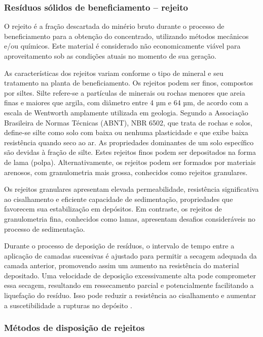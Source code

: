 \subsubsection{Resíduos sólidos de beneficiamento -- rejeito}
\label{subsubsec:rejeitos}

O rejeito é a fração descartada do minério bruto durante o processo de
beneficiamento para a obtenção do concentrado, utilizando métodos
mecânicos e/ou químicos. Este material é considerado não economicamente
viável para aproveitamento sob as condições atuais no momento de sua
geração.

As características dos rejeitos variam conforme o tipo de mineral e seu
tratamento na planta de beneficiamento. Os rejeitos podem ser finos,
compostos por siltes. Silte refere-se a partículas de minerais ou rochas
menores que areia finas e maiores que argila, com diâmetro entre 4 µm e
64 µm, de acordo com a escala de Wentworth amplamente utilizada em
geologia. Segundo a Associação Brasileira de Normas Técnicas (ABNT), NBR
6502, que trata de rochas e solos, define-se silte como solo com baixa
ou nenhuma plasticidade e que exibe baixa resistência quando seco ao ar.
As propriedades dominantes de um solo específico são devidas à fração de
silte. Estes rejeitos finos podem ser depositados na forma de lama
(polpa). Alternativamente, os rejeitos podem ser formados por materiais
arenosos, com granulometria mais grossa, conhecidos como rejeitos
granulares.

Os rejeitos granulares apresentam elevada permeabilidade, resistência
significativa ao cisalhamento e eficiente capacidade de sedimentação,
propriedades que favorecem sua estabilização em depósitos. Em contraste,
os rejeitos de granulometria fina, conhecidos como lamas, apresentam
desafios consideráveis no processo de sedimentação.

Durante o processo de deposição de resíduos, o intervalo de tempo entre
a aplicação de camadas sucessivas é ajustado para permitir a secagem
adequada da camada anterior, promovendo assim um aumento na resistência
do material depositado. Uma velocidade de deposição excessivamente alta
pode comprometer essa secagem, resultando em ressecamento parcial e
potencialmente facilitando a liquefação do resíduo. Isso pode reduzir a
resistência ao cisalhamento e aumentar a suscetibilidade a rupturas no
depósito \cite[p.360-361]{carvalho2018sustentabilidade}.

\subsubsection{Métodos de disposição de rejeitos}
\label{subsubsec:metodos_disposicao}

